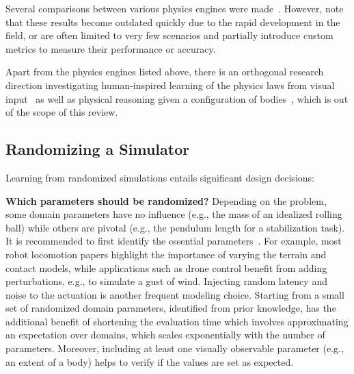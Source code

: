 \documentclass[utf8]{frontiersSCNS} %
\begin{document}
Several comparisons between various physics engines were made~\citep{Ivaldi_Nori_14,Erez_Todorov_15,Chung_Pollard_16,Collins_Leitner_19,Korber_Gluck_21}.
However, note that these results become outdated quickly due to the rapid development in the field, or are often limited to very few scenarios and partially introduce custom metrics to measure their performance or accuracy.

Apart from the physics engines listed above, there is an orthogonal research direction investigating human-inspired learning of the physics laws from visual input~\citep{Battaglia_Tenenbaum_13,Wu_Tenenbaum_15} as well as physical reasoning given a configuration of bodies~\citep{Battaglia_Kavukcuoglu_16}, which is out of the scope of this review. %

\subsection{Randomizing a Simulator}
\label{sec_sota_randomizing_simulators}
Learning from randomized simulations entails significant design decisions:

\textbf{Which parameters should be randomized?}
Depending on the problem, some domain parameters have no influence (e.g., the mass of an idealized rolling ball) while others are pivotal (e.g., the pendulum length for a stabilization task).
It is recommended to first identify the essential parameters~\citep{Xie_Garg_20}.
%
For example, most robot locomotion papers highlight the importance of varying the terrain and contact models, while applications such as drone control benefit from adding perturbations, e.g., to simulate a gust of wind.
Injecting random latency and noise to the actuation is another frequent modeling choice.
%
Starting from a small set of randomized domain parameters, identified from prior knowledge, has the additional benefit of shortening the evaluation time which involves approximating an expectation over domains, which scales exponentially with the number of parameters.
Moreover, including at least one visually observable parameter (e.g., an extent of a body) helps to verify if the values are set as expected.
\end{document}
